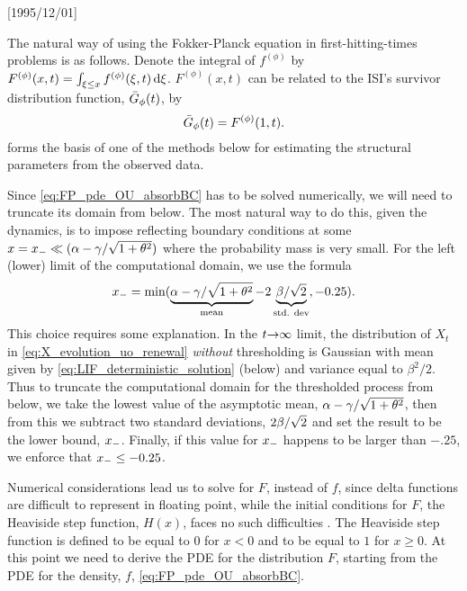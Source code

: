 \NeedsTeXFormat{LaTeX2e}[1995/12/01] \documentclass[10pt]{bmc_article}
\newenvironment{bmcformat}{\begin{raggedright}\baselineskip20pt\sloppy\setboolean{publ}{false}}{\end{raggedright}\baselineskip20pt\sloppy}
\begin{document}
\begin{bmcformat}
The natural way of using the Fokker-Planck equation in first-hitting-times
problems is as follows. Denote the integral of $f^{(\phi)}$ by $F^{(\phi)}(x,t)
= \int_{\xi \leq x} f^{(\phi)}(\xi, t) \, \mathrm{d} \xi$. $F^{(\phi)}(x,t)$ can be
related to the ISI's survivor distribution function, ${ \bar{G} }_{\phi}(t)$, by
\begin{equation}
{ \bar{G} }_{\phi}(t) = F^{(\phi)}(1,t).
\label{eq:SDF_vs_F_at_thresh}
\end{equation}
 forms the
basis of one of the methods below for estimating the structural parameters from
the observed data.

Since \cref{eq:FP_pde_OU_absorbBC} has to be solved numerically, we will need to
truncate its domain from below. The most natural way to do this, given the
dynamics, is to impose reflecting boundary conditions at some $x={ x_{-} } \ll
({\alpha}-{\gamma }/\sqrt{1+{\theta}^2})$ where the probability mass is very small. For the left
(lower) limit of the computational domain, we use the formula $$ { x_{-} } =
\min(\underbrace{{\alpha} -{\gamma }/\sqrt{1+{\theta}^2}}_{\textrm{mean}} - 2 \underbrace{{\beta}/
\sqrt{2}}_{\textrm{std. dev}}, -0.25).$$ This choice requires some explanation.
In the $t{\rightarrow} \infty$ limit, the distribution of $X_t$ in
\cref{eq:X_evolution_uo_renewal} {\sl without} thresholding is Gaussian with
mean given by \cref{eq:LIF_deterministic_solution} (below) and variance equal to
$\beta^2/2$. Thus to truncate the computational
domain for the thresholded process from below, we take the lowest value of
the asymptotic mean, $\alpha - \gamma / \sqrt{1 + {\theta}^2}$, then from
this we subtract two standard deviations, $2{\beta}/\sqrt{2}$ and set the result to be the lower
bound, ${ x_{-} }$. Finally, if this value for ${ x_{-} }$ happens to be larger than
$-.25$, we enforce that  ${ x_{-} } \leq -0.25$. 


Numerical considerations lead us to solve for $F$, instead of $f$, since delta
functions are difficult to represent in floating point, while the initial
conditions for $F$, the Heaviside step function, $H(x)$, faces no such
difficulties \cite{Hurn2005}. The Heaviside step function is defined to be
equal to $0$ for $x<0$ and to be equal to $1$ for $x \geq 0$. At this point we
need to derive the PDE for the distribution $F$, starting from the PDE for the
density, $f$, \cref{eq:FP_pde_OU_absorbBC}.


\end{bmcformat}
\end{document}
